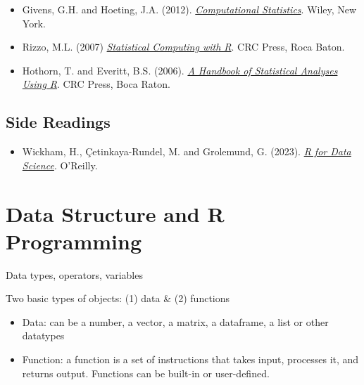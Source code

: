 \documentclass[
  letterpaper,
  DIV=11,
  numbers=noendperiod]{scrreprt}
\providecommand{\tightlist}{%
  \setlength{\itemsep}{0pt}\setlength{\parskip}{0pt}}
\begin{document}

\begin{itemize}
\item
  Givens, G.H. and Hoeting, J.A. (2012).
  \href{https://www.stat.colostate.edu/computationalstatistics/}{\emph{Computational
  Statistics}}. Wiley, New York.
\item
  Rizzo, M.L. (2007)
  \href{https://a-roshani.ir/files/SC/\%5B4\%5D\%20\%5BMaria\%20L.\%20Rizzo\%5D\%5B2019\%5D\%20Statistical\%20Computing\%20\%20with\%20R,\%20Second\%20Edition.pdf}{\emph{Statistical
  Computing with R}}. CRC Press, Roca Baton.
\item
  Hothorn, T. and Everitt, B.S. (2006).
  \href{https://digitallibrary.tsu.ge/book/2019/september/books/A-Handbook-of-Statistical-Analyses.pdf}{\emph{A
  Handbook of Statistical Analyses Using R}}. CRC Press, Boca Raton.
\end{itemize}

\section*{Side Readings}\label{side-readings}


\begin{itemize}
\tightlist
\item
  Wickham, H., Çetinkaya-Rundel, M. and Grolemund, G. (2023).
  \href{https://r4ds.hadley.nz/}{\emph{R for Data Science}}. O'Reilly.
\end{itemize}


\chapter{Data Structure and R
Programming}\label{data-structure-and-r-programming}

Data types, operators, variables

Two basic types of objects: (1) data \& (2) functions

\begin{itemize}
\item
  Data: can be a number, a vector, a matrix, a dataframe, a list or
  other datatypes
\item
  Function: a function is a set of instructions that takes input,
  processes it, and returns output. Functions can be built-in or
  user-defined.
\end{itemize}
\end{document}
